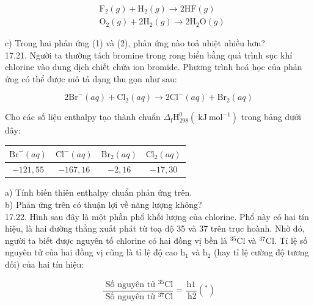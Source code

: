 \documentclass[10pt]{article}
\begin{document}
\begin{align*}
& \mathrm{F}_{2}(g)+\mathrm{H}_{2}(g) \rightarrow 2 \mathrm{HF}(g)  \tag{1}\\
& \mathrm{O}_{2}(g)+2 \mathrm{H}_{2}(g) \rightarrow 2 \mathrm{H}_{2} \mathrm{O}(g) \tag{2}
\end{align*}


c) Trong hai phản ứng (1) và (2), phản ứng nào toả nhiệt nhiều hơn?\\
17.21. Người ta thường tách bromine trong rong biển bằng quá trình sục khí chlorine vào dung dịch chiết chứa ion bromide. Phương trình hoá học của phản ứng có thể được mô tả dạng thu gọn như sau:

$$
2 \mathrm{Br}^{-}(a q)+\mathrm{Cl}_{2}(a q) \rightarrow 2 \mathrm{Cl}^{-}(a q)+\mathrm{Br}_{2}(a q)
$$

Cho các số liệu enthalpy tạo thành chuẩn $\Delta_{\mathrm{f}} \mathrm{H}_{298}^{0}\left(\mathrm{~kJ} \mathrm{~mol}^{-1}\right)$ trong bảng dưới đây:

\begin{center}
\begin{tabular}{|c|c|c|c|}
\hline
$\mathrm{Br}^{-}(a q)$ & $\mathrm{Cl}^{-}(a q)$ & $\mathrm{Br}_{2}(a q)$ & $\mathrm{Cl}_{2}(a q)$ \\
\hline
$-121,55$ & $-167,16$ & $-2,16$ & $-17,30$ \\
\hline
\end{tabular}
\end{center}

a) Tính biến thiên enthalpy chuẩn phản ứng trên.\\
b) Phản ửng trên có thuận lợi về năng lượng không?\\
17.22. Hình sau đây là một phần phổ khối lượng của chlorine. Phổ này có hai tín hiệu, là hai đường thẳng xuất phát từ toạ độ 35 và 37 trên trục hoành. Nhờ đó, người ta biết được nguyên tố chlorine có hai đồng vị bền là ${ }^{35} \mathrm{Cl}$ và ${ }^{37} \mathrm{Cl}$. Tỉ lệ số nguyên tử của hai đồng vị cũng là tỉ lệ độ cao $\mathrm{h}_{1}$ và $\mathrm{h}_{2}$ (hay tỉ lệ cường độ tương đối) của hai tín hiệu:

$$
\frac{\text { Số nguyên tử }{ }^{35} \mathrm{Cl}}{\text { Số nguyên từ }{ }^{37} \mathrm{Cl}}=\frac{\mathrm{h} 1}{\mathrm{~h} 2}\left({ }^{*}\right)
$$
\end{document}
